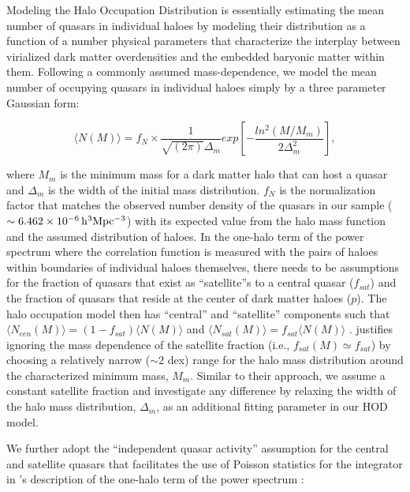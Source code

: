 \documentclass[useAMS,usenatbib]{mn2e}
\begin{document}
Modeling the Halo Occupation Distribution is essentially estimating the mean 
number of quasars in individual haloes by modeling their distribution as a 
function of a number physical parameters that characterize the interplay between 
virialized dark matter overdensities and the embedded baryonic matter within 
them.  Following a commonly assumed mass-dependence, we model the mean number of 
occupying quasars in individual haloes simply by a three parameter Gaussian 
form: 

\begin{equation}
\langle N(M) \rangle = f_{N} \times \frac{1}{\sqrt{\left(2\pi \right)}\Delta_m} exp[-\frac{ln^2(M/M_m)}{2\Delta^{2}_m}],
\end{equation}

where $M_m$ is the minimum mass for a dark matter halo that can host a quasar 
and $\Delta_m$ is the width of the initial mass distribution. $f_N$ is the 
normalization factor that matches the observed number density of the quasars in 
our sample ($\sim6.462 \times 10^{-6} \, \rm h^3 Mpc^{-3}$) with its expected 
value from the halo mass function and the assumed distribution of haloes.
In the one-halo term of the power spectrum where the correlation function is 
measured with the pairs of haloes within boundaries of individual haloes 
themselves, there needs to be assumptions for the fraction of quasars that exist 
as ``satellite''s to a central quasar ($f_{sat}$) and the fraction of quasars 
that reside at the center of dark matter haloes ($p$). 
The halo occupation model then has ``central'' and ``satellite'' components such 
that $\langle N_{cen}(M)\rangle = (1-f_{sat})\langle N(M)\rangle$ and $\langle 
N_{sat}(M)\rangle = f_{sat} \langle N(M)\rangle$ \citep{bw02,kra04, zh05}.
\citet{ko12} justifies ignoring the mass dependence of the satellite fraction 
(i.e., $f_{sat}(M) \simeq f_{sat}$) by choosing a relatively narrow ($\sim 2$ 
dex) range for the halo mass distribution around the characterized minimum mass, 
$M_m$. Similar to their approach, we assume a constant satellite fraction and 
investigate any difference by relaxing the width of the halo mass distribution, 
$\Delta_m$, as an additional fitting parameter in our HOD model. 




We further adopt the ``independent quasar activity'' assumption for the central 
and satellite quasars that facilitates the use of Poisson statistics for the 
integrator in \citep{sel00}'s description of the one-halo term of the power 
spectrum \citep{ko12}:
\end{document}
